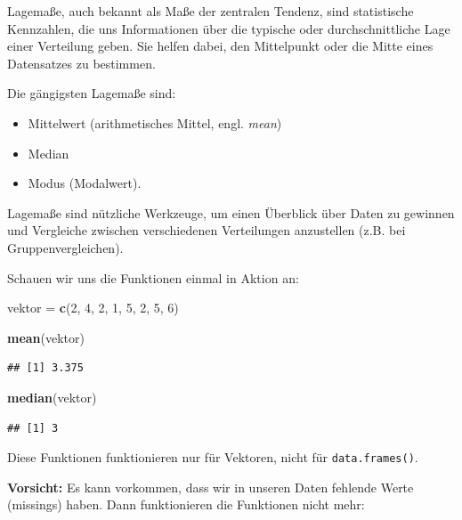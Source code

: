 \documentclass[
]{book}
\newenvironment{Shaded}{\begin{snugshade}}{\end{snugshade}}
\newcommand{\DecValTok}[1]{\textcolor[rgb]{0.00,0.00,0.81}{#1}}
\newcommand{\FunctionTok}[1]{\textcolor[rgb]{0.13,0.29,0.53}{\textbf{#1}}}
\newcommand{\NormalTok}[1]{#1}
\newcommand{\OtherTok}[1]{\textcolor[rgb]{0.56,0.35,0.01}{#1}}
\providecommand{\tightlist}{%
  \setlength{\itemsep}{0pt}\setlength{\parskip}{0pt}}
\begin{document}
Lagemaße, auch bekannt als Maße der zentralen Tendenz, sind statistische Kennzahlen, die uns Informationen über die typische oder durchschnittliche Lage einer Verteilung geben. Sie helfen dabei, den Mittelpunkt oder die Mitte eines Datensatzes zu bestimmen.

Die gängigsten Lagemaße sind:

\begin{itemize}
\tightlist
\item
  Mittelwert (arithmetisches Mittel, engl. \emph{mean})
\item
  Median
\item
  Modus (Modalwert).
\end{itemize}

Lagemaße sind nützliche Werkzeuge, um einen Überblick über Daten zu gewinnen und Vergleiche zwischen verschiedenen Verteilungen anzustellen (z.B. bei Gruppenvergleichen).

Schauen wir uns die Funktionen einmal in Aktion an:

\begin{Shaded}
\begin{Highlighting}[]
\NormalTok{vektor }\OtherTok{=} \FunctionTok{c}\NormalTok{(}\DecValTok{2}\NormalTok{, }\DecValTok{4}\NormalTok{, }\DecValTok{2}\NormalTok{, }\DecValTok{1}\NormalTok{, }\DecValTok{5}\NormalTok{, }\DecValTok{2}\NormalTok{, }\DecValTok{5}\NormalTok{, }\DecValTok{6}\NormalTok{)}

\FunctionTok{mean}\NormalTok{(vektor)}
\end{Highlighting}
\end{Shaded}

\begin{verbatim}
## [1] 3.375
\end{verbatim}

\begin{Shaded}
\begin{Highlighting}[]
\FunctionTok{median}\NormalTok{(vektor)}
\end{Highlighting}
\end{Shaded}

\begin{verbatim}
## [1] 3
\end{verbatim}

Diese Funktionen funktionieren nur für Vektoren, nicht für \texttt{data.frames()}.

\textbf{Vorsicht:} Es kann vorkommen, dass wir in unseren Daten fehlende Werte (missings) haben. Dann funktionieren die Funktionen nicht mehr:
\end{document}
